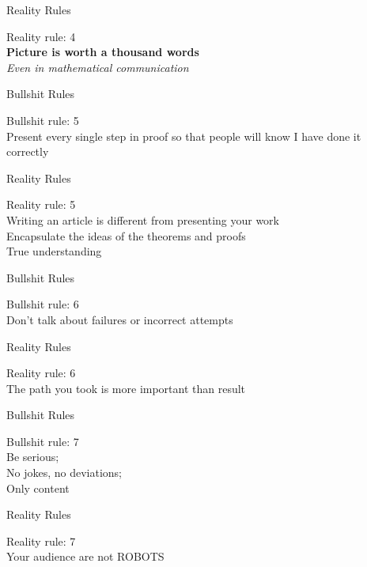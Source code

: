 \documentclass{beamer}
\newcommand{\BS}[1]{\Huge{Bullshit rule: #1}\\}
\newcommand{\RR}[1]{\color{white}\Huge{Reality rule: #1}\\}
\newcommand{\BBS}{Bullshit Rules}
\newcommand{\RRS}{\color{white}Reality Rules}
\begin{document}
\begin{frame}{\RRS}
	\begin{center}
		\RR{4}
		\Huge{\textbf{Picture is worth a thousand words}}\\
		\Huge{\emph{Even in mathematical communication}}
	\end{center}
\end{frame}

\begin{frame}{\BBS}
	\begin{center}
		\BS{5}
		\Huge{Present every single step in proof so that people will know I have done it correctly}
	\end{center}
\end{frame}

\begin{frame}{\RRS}
	\begin{center}
		\RR{5}
		\Huge{Writing an article is different from presenting your work}\\
		\pause
		\Huge{Encapsulate the ideas of the theorems and proofs}\\
		\pause
		\Huge{True understanding}
	\end{center}
\end{frame}

\begin{frame}{\BBS}
	\begin{center}
		\BS{6}
		\Huge{Don't talk about failures or incorrect attempts}
	\end{center}
\end{frame}

\begin{frame}{\RRS}
	\begin{center}
		\RR{6}
		\Huge{The path you took is more important than result}
	\end{center}
\end{frame}

\begin{frame}{\BBS}
	\begin{center}
		\BS{7}
		\Huge{Be serious;\\No jokes, no deviations;\\Only content}
	\end{center}
\end{frame}

\begin{frame}{\RRS}
	\begin{center}
		\RR{7}
		\Huge{Your audience are not ROBOTS}
	\end{center}
\end{frame}
%
\end{document}
